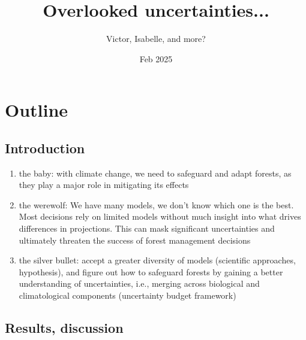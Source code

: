 \documentclass[11pt,letter]{article}
\title{Overlooked uncertainties...}
\author{Victor, Isabelle, and more?}
\date{Feb 2025}
\begin{document}
\maketitle

\section*{Outline}

\subsection*{Introduction}

\begin{enumerate}

\item the baby: with climate change, we need to safeguard and adapt forests, as they play a major role in mitigating its effects

\item the werewolf: We have many models, we don't know which one is the best. Most decisions rely on limited models without much insight into what drives differences in projections. This can mask significant uncertainties and ultimately threaten the success of forest management decisions

\item the silver bullet: accept a greater diversity of models (scientific approaches, hypothesis), and figure out how to safeguard forests by gaining a better understanding of uncertainties, i.e., merging across biological and climatological components (uncertainty budget framework)


\end{enumerate}


\subsection*{Results, discussion}
\end{document}
